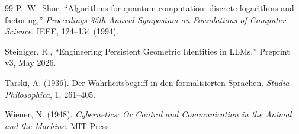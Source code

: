 \documentclass[12pt,oneside]{book}
\begin{document}
\begin{thebibliography}{99}
P.~W.~Shor,
``Algorithms for quantum computation: discrete logarithms and factoring,''
\emph{Proceedings 35th Annual Symposium on Foundations of Computer Science}, IEEE, 124--134 (1994).

Steiniger, R.,
``Engineering Persistent Geometric Identities in LLMs,''
Preprint v3, May 2026.

Tarski, A. (1936). Der Wahrheitsbegriff in den formalisierten Sprachen. \emph{Studia Philosophica}, 1, 261--405.

Wiener, N. (1948). \emph{Cybernetics: Or Control and Communication in the Animal and the Machine}. MIT Press.

\end{thebibliography}
\end{document}
